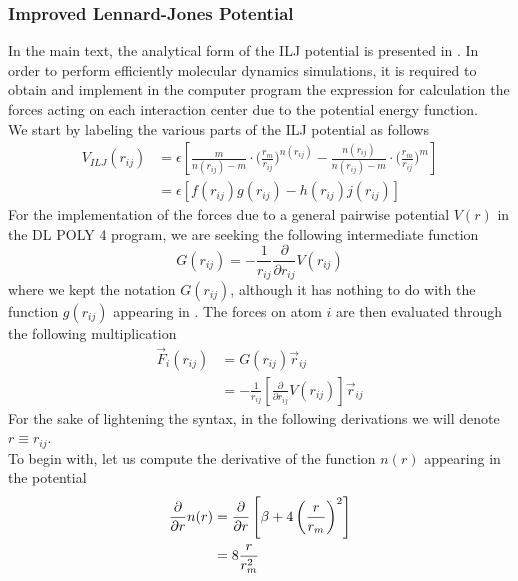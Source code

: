 \documentclass[utf8]{article}
\begin{document}
\subsubsection{Improved Lennard-Jones Potential}
In the main text, the analytical form of the ILJ potential is presented in .
In order to perform efficiently molecular dynamics simulations, it is required to obtain
and implement in the computer program the expression for calculation the forces acting
on each interaction center due to the potential energy function.\\
We start by labeling the various parts of the ILJ potential as follows
%
\begin{align}
    V_{ILJ}(r_{ij}) &= \epsilon \left[ \frac{m}{n(r_{ij})-m} \cdot
                       \Big( \frac{r_m}{r_{ij}} \Big)^{n(r_{ij})} -
                       \frac{n(r_{ij})}{n(r_{ij})-m} \cdot 
                       \Big( \frac{r_m}{r_{ij}} \Big)^{m} \right] \\
                    &= \epsilon \left[ f(r_{ij}) g(r_{ij}) - h(r_{ij}) j(r_{ij}) \right]
                    \label{eq:V_ILJ_simple}
\end{align}
%
For the implementation of the forces due to a general pairwise potential $V(r)$ in the DL POLY
4 program\cite{}, we are seeking the following intermediate function
%
\begin{equation}
    G(r_{ij}) = - \frac{1}{r_{ij}} \frac{\partial}{\partial r_{ij}} V(r_{ij})
\end{equation}
%
where we kept the notation $G(r_{ij})$, although it has nothing to do with the function
$g(r_{ij})$ appearing in .
The forces on atom $i$ are then evaluated through the following multiplication
%
\begin{equation}\label{eq:forces}
    \begin{aligned}
    \vec{F}_i(r_{ij}) &= G(r_{ij}) \vec{r}_{ij} \\
    &= -\frac{1}{r_{ij}} \left[ \frac{\partial}{\partial r_{ij}} V(r_{ij}) \right] \vec{r}_{ij}
    \end{aligned}
\end{equation}
For the sake of lightening the syntax, in the following derivations we will denote
$r \equiv r_{ij}$.\\
To begin with, let us compute the derivative of the function $n(r)$ appearing in the
potential
%
\begin{align}
    \frac{\partial}{\partial r} n(r) &= \frac{\partial}{\partial r} \left[ \beta + 4 \left( \frac{r}{r_m} \right)^2 \right] \\
    &= 8 \frac{r}{r_m^2}
\end{align}
\end{document}
